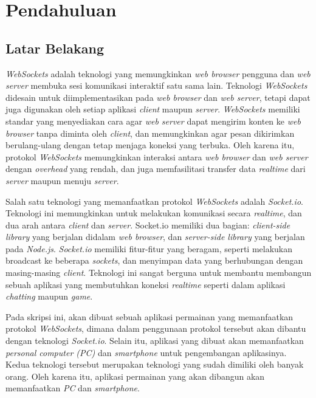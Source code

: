 \chapter{Pendahuluan}
\label{chap:intro}
   
\section{Latar Belakang}
\label{sec:label}

\textit{WebSockets} adalah teknologi yang memungkinkan \textit{web browser} pengguna dan \textit{web server} membuka sesi komunikasi interaktif satu sama lain. Teknologi \textit{WebSockets}  didesain untuk diimplementasikan pada \textit{web browser} dan \textit{web server}, tetapi dapat juga digunakan oleh setiap aplikasi \textit{client} maupun \textit{server}. \textit{WebSockets} memiliki standar yang menyediakan cara agar \textit{web server} dapat mengirim konten ke \textit{web browser} tanpa diminta oleh \textit{client}, dan memungkinkan agar pesan dikirimkan berulang-ulang dengan tetap menjaga koneksi yang terbuka. Oleh karena itu, protokol \textit{WebSockets} memungkinkan interaksi antara \textit{web browser} dan \textit{web server} dengan \textit{overhead} yang rendah, dan juga memfasilitasi transfer data \textit{realtime} dari \textit{server} maupun menuju \textit{server}.

Salah satu teknologi yang memanfaatkan protokol \textit{WebSockets} adalah \textit{Socket.io}. Teknologi ini memungkinkan untuk melakukan komunikasi secara \textit{realtime}, dan dua arah antara \textit{client} dan \textit{server}. Socket.io memiliki dua bagian: \textit{client-side library} yang berjalan didalam \textit{web browser}, dan \textit{server-side library} yang berjalan pada \textit{Node.js}. \textit{Socket.io} memiliki fitur-fitur yang beragam, seperti melakukan broadcast ke beberapa \textit{sockets}, dan menyimpan data yang berhubungan dengan masing-masing \textit{client}. Teknologi ini sangat berguna untuk membantu membangun sebuah aplikasi yang membutuhkan koneksi \textit{realtime} seperti dalam aplikasi \textit{chatting} maupun \textit{game}.

Pada skripsi ini, akan dibuat sebuah aplikasi permainan yang memanfaatkan protokol \textit{WebSockets}, dimana dalam penggunaan protokol tersebut akan dibantu dengan teknologi \textit{Socket.io}. Selain itu, aplikasi yang dibuat akan memanfaatkan \textit{personal computer (PC)} dan \textit{smartphone} untuk pengembangan aplikasinya. Kedua teknologi tersebut merupakan teknologi yang sudah dimiliki oleh banyak orang. Oleh karena itu, aplikasi permainan yang akan dibangun akan memanfaatkan \textit{PC} dan \textit{smartphone}.


